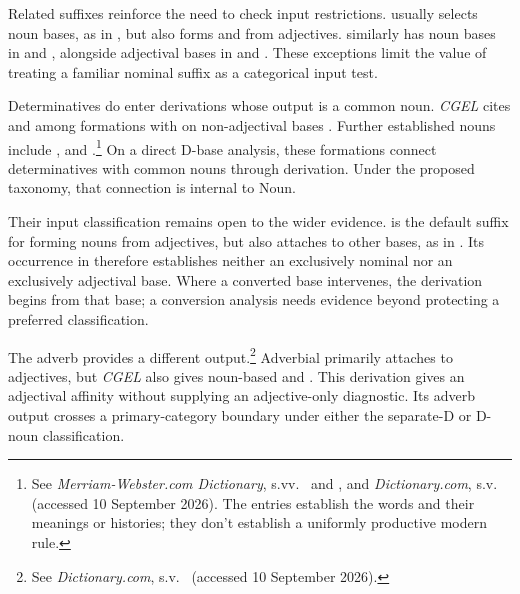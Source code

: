 \documentclass[12pt]{article}
\begin{document}
Related suffixes reinforce the need to check input restrictions.  usually selects noun bases, as in , but also forms  and  from adjectives.  similarly has noun bases in  and , alongside adjectival bases in  and  \citep[Ch.~19, §5.7.2(e--f)]{huddleston2002}. These exceptions limit the value of treating a familiar nominal suffix as a categorical input test.

Determinatives do enter derivations whose output is a common noun. \textit{CGEL} cites  and  among formations with  on non-adjectival bases \citep[Ch.~19, §5.7.2(i)]{huddleston2002}. Further established nouns include ,  and .\footnote{See \textit{Merriam-Webster.com Dictionary}, s.vv.\ \href{https://www.merriam-webster.com/dictionary/thisness}{} and \href{https://www.merriam-webster.com/dictionary/fewness}{}, and \textit{Dictionary.com}, s.v.\ \href{https://www.dictionary.com/browse/muchness}{} (accessed 10 September 2026). The entries establish the words and their meanings or histories; they don't establish a uniformly productive modern rule.} On a direct D-base analysis, these formations connect determinatives with common nouns through derivation. Under the proposed taxonomy, that connection is internal to Noun.

Their input classification remains open to the wider evidence.  is the default suffix for forming nouns from adjectives, but also attaches to other bases, as in . Its occurrence in  therefore establishes neither an exclusively nominal nor an exclusively adjectival base. Where a converted base intervenes, the derivation begins from that base; a conversion analysis needs evidence beyond protecting a preferred classification.

The adverb  provides a different output.\footnote{See \textit{Dictionary.com}, s.v.\ \href{https://www.dictionary.com/browse/mostly}{} (accessed 10 September 2026).} Adverbial  primarily attaches to adjectives, but \textit{CGEL} also gives noun-based  and  \citep[566]{huddleston2002}. This derivation gives  an adjectival affinity without supplying an adjective-only diagnostic. Its adverb output crosses a primary-category boundary under either the separate-D or D-noun classification.
\end{document}

